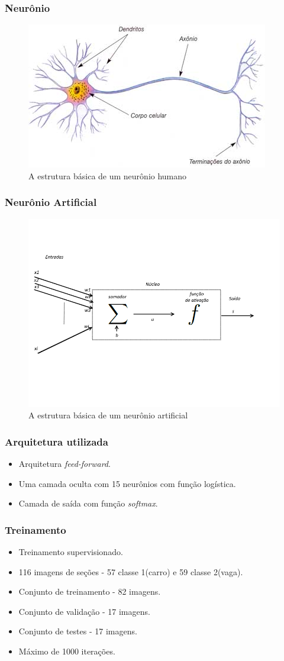 \documentclass{beamer}
\begin{document}
\begin{frame}
\frametitle{Neurônio}
\begin{figure}
\centering
\includegraphics[width=.6\textwidth]{neuronio}
\caption{A estrutura básica de um neurônio humano}
\end{figure}
\end{frame}

\begin{frame}
\frametitle{Neurônio Artificial}
\begin{figure}
\centering
\includegraphics[width=.6\textwidth]{NeuronioArtificial}
\caption{A estrutura básica de um neurônio artificial}
\end{figure}
\end{frame}

\begin{frame}
\frametitle{Arquitetura utilizada}
\begin{itemize}
	\item Arquitetura \textit{feed-forward}.
	\item Uma camada oculta com 15 neurônios com função logística.
	\item Camada de saída com função  \textit{softmax}.
\end{itemize}
\end{frame}

\begin{frame}
\frametitle{Treinamento}
\begin{itemize}
	\item Treinamento supervisionado.
	\item 116 imagens de seções - 57 classe 1(carro) e 59 classe 2(vaga).
	\item Conjunto de treinamento - 82 imagens.
	\item Conjunto de validação - 17 imagens.
	\item Conjunto de testes - 17 imagens.
	\item Máximo de 1000 iterações.
\end{itemize}
\end{frame}
\end{document}
